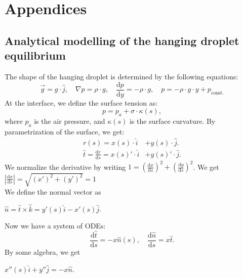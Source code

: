 \documentclass{jfm}
\begin{document}
\section{Appendices} 
\subsection{Analytical modelling of the hanging droplet equilibrium} \label{app:equi}
    The shape of the hanging droplet is determined by the following equations:\\
    \begin{equation}
        \vec{g}=g\cdot\hat{j}, \quad
        \nabla{p}=\rho\cdot{g}, \quad
        \frac{\mathrm{d}p}{\mathrm{d}y}=-\rho\cdot{g}, \quad
        p=-\rho\cdot{g}\cdot{y}+p_{\text{const.}}
    \end{equation}
    At the interface, we define the surface tension as:\\
    \begin{equation}
        p=p_{a}+\sigma \cdot \kappa(s),
        \label{eq:pressure}
    \end{equation}
    where $p_{a}$ is the air pressure, and $\kappa(s)$ is the surface curvature. By parametrization of the surface, we get:\\
    \begin{align}
        r(s)=x(s)\cdot\hat{i}&+y(s)\cdot\hat{j}.\\
        \hat{t}=\frac{\mathrm{d}r}{\mathrm{d}s}=x(s)'\cdot\hat{i}&+y(s)'\cdot\hat{j}.
    \end{align}
    We normalize the derivative by writing $1=\left(\frac{\mathrm{d}x}{\mathrm{d}s}\right)^2+\left(\frac{\mathrm{d}y}{\mathrm{d}s}\right)^2$. We get $\left|\frac{\mathrm{d}x}{\mathrm{d}s}\right|=\sqrt{(x')^2+(y')^2}=1$\\
    We define the normal vector as\\
    \begin{center}
        $\hat{n}=\hat{t}\times\hat{k}=y'(s)\hat{i}-x'(s)\hat{j}$.
    \end{center}
    Now we have a system of ODEs:\\
    \begin{equation}
        \frac{\mathrm{d}\hat{t}}{\mathrm{d}s}=-x\hat{n}(s), \quad
        \frac{\mathrm{d}\hat{n}}{\mathrm{d}s}=x\hat{t}.
    \end{equation}
    By some algebra, we get\\
    \begin{center}
        $x''(s)\hat{i}+y''\hat{j}=-x\hat{n}$.
    \end{center}
\end{document}
